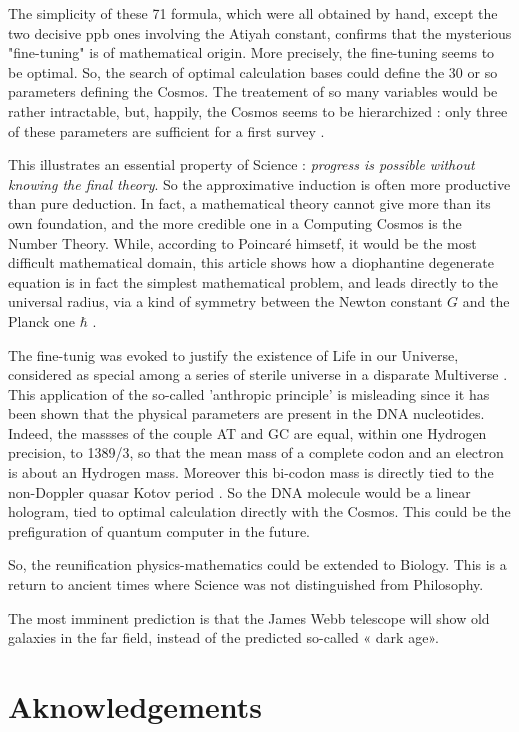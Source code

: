 \documentclass[a4paper,9pt]{article}
\begin{document}
The simplicity of these 71 formula, which were all obtained by hand, except the two decisive ppb ones involving the Atiyah constant, confirms that the mysterious "fine-tuning" is of mathematical origin. More precisely, the fine-tuning seems to be optimal. So, the search of optimal calculation bases could define the 30 or so parameters defining the Cosmos. The treatement of so many variables would be rather intractable, but, happily, the Cosmos seems to be hierarchized : only three of these parameters are sufficient for a first survey \cite{Carr}. 


This illustrates an essential property of Science : \textit{progress is possible without knowing the final theory}. So the approximative induction is often more productive than pure deduction. In fact, a mathematical theory cannot give more than its own foundation, and the more credible one in a Computing Cosmos is the Number Theory. While, according to Poincar\'e himsetf, it would be the most difficult mathematical domain, this article shows how a diophantine degenerate equation is in fact the simplest mathematical problem, and leads directly to the universal radius, via a kind of symmetry between the Newton constant $G$ and the Planck one $\hbar$ .   


The fine-tunig was evoked to justify the existence of Life in our Universe, considered as special among a series of sterile universe in a disparate Multiverse \cite{Carr}. This application of the so-called 'anthropic principle' is misleading since it has been shown that the physical parameters are present in the DNA nucleotides. Indeed, the massses of the couple AT and GC are equal, within one Hydrogen precision, to 1389/3, so that the mean mass of a complete codon and an electron is about an Hydrogen mass. Moreover this bi-codon mass is directly tied to the non-Doppler quasar Kotov period \cite{Sanchez3}. So the DNA molecule would be a linear hologram, tied to optimal calculation directly with the Cosmos. This could be the prefiguration of quantum computer in the future.


So, the reunification physics-mathematics could be extended to Biology. This is a return to ancient times where Science was not distinguished from Philosophy.


The most imminent prediction is that the James Webb telescope will show old galaxies in the far field, instead of the predicted so-called « dark age».

\section {Aknowledgements}
\end{document}

